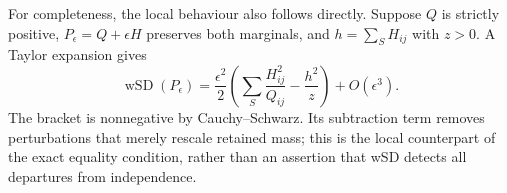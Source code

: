 For completeness, the local behaviour also follows directly. Suppose $Q$ is strictly positive, $P_\epsilon=Q+\epsilon H$ preserves both marginals, and $h=\sum_S H_{ij}$ with $z>0$. A Taylor expansion gives
\begin{equation}
\operatorname{wSD}(P_\epsilon)
=\frac{\epsilon^2}{2}\left(
\sum_S\frac{H_{ij}^2}{Q_{ij}}-\frac{h^2}{z}\right)
+O(\epsilon^3).
\end{equation}
The bracket is nonnegative by Cauchy--Schwarz. Its subtraction term removes perturbations that merely rescale retained mass; this is the local counterpart of the exact equality condition, rather than an assertion that wSD detects all departures from independence.
